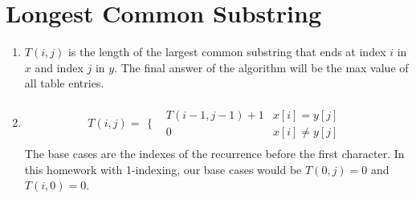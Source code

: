 \documentclass{article}
\begin{document}
\newpage
\section{Longest Common Substring}
\begin{enumerate}
    \item $T(i, j)$ is the length of the largest common substring that ends at index $i$ in $x$ and index $j$ in $y$.
            The final answer of the algorithm will be the max value of all table entries.
    \item 
        \begin{align*}
            T(i, j) = 
            \begin{array}{cc}
                \Bigg\{ & 
                \begin{array}{cc}
                    T(i-1, j-1) + 1 & x[i] = y[j] \\
                    0 & x[i] \neq y[j] 
                \end{array}
            \end{array}
        \end{align*}
        The base cases are the indexes of the recurrence before the first character. In this homework with 1-indexing, our base cases would be $T(0, j) = 0$ and $T(i, 0) = 0$.
        

\end{enumerate}
\end{document}
